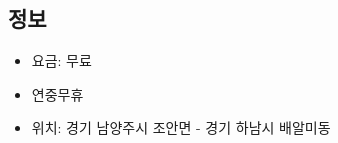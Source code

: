 \subsection{정보}
\begin{itemize}
    \item 요금: 무료
    \item 연중무휴
    \item 위치: 경기 남양주시 조안면 - 경기 하남시 배알미동
\end{itemize}